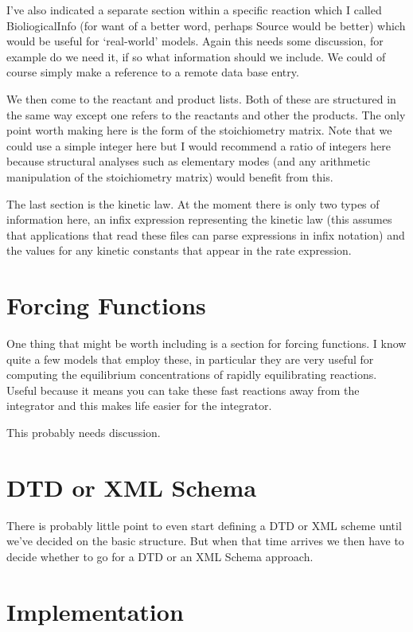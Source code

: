 \documentclass{article}
\begin{document}
I've also indicated a separate section within a specific reaction which I
called BioliogicalInfo (for want of a better word, perhaps Source would be
better) which would be useful for `real-world' models. Again this needs some
discussion, for example do we need it, if so what information should we
include. We could of course simply make a reference to a remote data base
entry.

We then come to the reactant and product lists. Both of these are structured
in the same way except one refers to the reactants and other the products. The
only point worth making here is the form of the stoichiometry matrix. Note
that we could use a simple integer here but I would recommend a ratio of
integers here because structural analyses such as elementary modes (and any
arithmetic manipulation of the stoichiometry matrix) would benefit from this.


The last section is the kinetic law. At the moment there is only two types of
information here, an infix expression representing the kinetic law (this
assumes that applications that read these files can parse expressions in infix
notation) and the values for any kinetic constants that appear in the rate
expression.

\section*{Forcing Functions}

One thing that might be worth including is a section for forcing functions. I
know quite a few models that employ these, in particular they are very useful
for computing the equilibrium concentrations of rapidly equilibrating
reactions. Useful because it means you can take these fast reactions away from
the integrator and this makes life easier for the integrator.

This probably needs discussion.


\section*{DTD or XML Schema}

There is probably little point to even start defining a DTD or XML scheme
until we've decided on the basic structure. But when that time arrives we then
have to decide whether to go for a DTD or an XML Schema approach.

\section*{Implementation}
\end{document}
